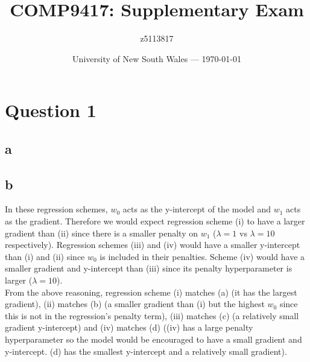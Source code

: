 \documentclass{article}
\title{COMP9417: Supplementary Exam} %
\author{z5113817} %
\date{University of New South Wales --- \today} %
\begin{document}




\section*{Question 1}

\subsection*{a}


\subsection*{b}

In these regression schemes, \(w_{0}\) acts as the y-intercept of the model and \(w_{1}\) acts as the gradient. Therefore we would expect 
regression scheme (i) to have a larger gradient than (ii) since there is a smaller penalty on \(w_{1}\) (\(\lambda = 1\) vs \(\lambda = 10\) respectively).
Regression schemes (iii) and (iv) would have a smaller y-intercept than (i) and (ii) since \(w_{0}\) is included in their penalties. Scheme (iv) would have 
a smaller gradient and y-intercept than (iii) since its penalty hyperparameter is larger (\(\lambda = 10\)).\\

From the above reasoning, regression scheme (i) matches (a) (it has the largest gradient), (ii) matches (b) (a smaller gradient than (i) but the highest \(w_{0}\) since this
is not in the regression's penalty term), (iii) matches (c) (a relatively small gradient y-intercept) and (iv) matches (d) ((iv) has a large penalty hyperparameter
so the model would be encouraged to have a small gradient and y-intercept. (d) has the smallest y-intercept and a relatively small gradient).
\end{document}
